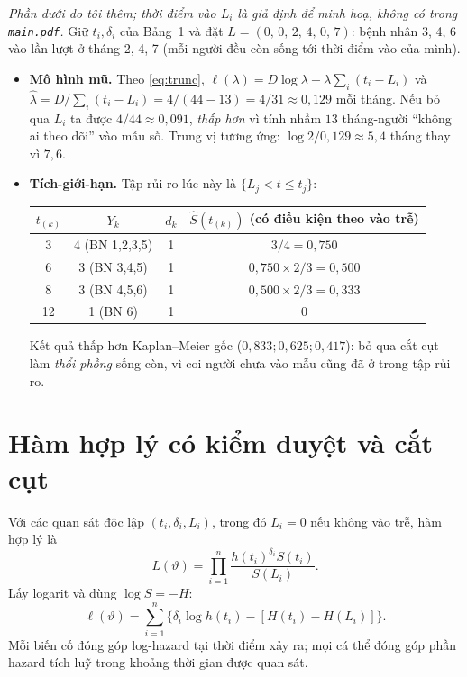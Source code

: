 \documentclass[11pt,a4paper,notitlepage]{report}
\begin{document}
\begin{vidu}
\textit{Phần dưới do tôi thêm; thời điểm vào $L_i$ là giả định để minh hoạ, không có trong \texttt{main.pdf}.} Giữ $t_i,\delta_i$ của Bảng~1 và đặt
$L=(0,\,0,\,2,\,4,\,0,\,7)$: bệnh nhân 3, 4, 6 vào lần lượt ở tháng 2, 4, 7 (mỗi người đều còn sống tới thời điểm vào của mình).
\begin{itemize}[leftmargin=1.4em,itemsep=1pt]
\item \textbf{Mô hình mũ.} Theo \eqref{eq:trunc}, $\ell(\lambda)=D\log\lambda-\lambda\sum_i(t_i-L_i)$ và $\hat\lambda=D/\sum_i(t_i-L_i)=4/(44-13)=4/31\approx0{,}129$ mỗi tháng.
Nếu bỏ qua $L_i$ ta được $4/44\approx0{,}091$, \emph{thấp hơn} vì tính nhầm $13$ tháng-người ``không ai theo dõi'' vào mẫu số. Trung vị tương ứng: $\log2/0{,}129\approx5{,}4$ tháng thay vì $7{,}6$.
\item \textbf{Tích-giới-hạn.} Tập rủi ro lúc này là $\{L_j<t\le t_j\}$:
\begin{center}\small
\begin{tabular}{cccc}
\toprule
$t_{(k)}$ & $Y_k$ & $d_k$ & $\hat S(t_{(k)})$ (có điều kiện theo vào trễ)\\
\midrule
3 & 4 (BN 1,2,3,5) & 1 & $3/4=0{,}750$\\
6 & 3 (BN 3,4,5) & 1 & $0{,}750\times 2/3=0{,}500$\\
8 & 3 (BN 4,5,6) & 1 & $0{,}500\times 2/3=0{,}333$\\
12 & 1 (BN 6) & 1 & $0$\\
\bottomrule
\end{tabular}
\end{center}
Kết quả thấp hơn Kaplan--Meier gốc ($0{,}833;0{,}625;0{,}417$): bỏ qua cắt cụt làm \emph{thổi phồng} sống còn, vì coi người chưa vào mẫu cũng đã ở trong tập rủi ro.
\end{itemize}
\end{vidu}

\section{Hàm hợp lý có kiểm duyệt và cắt cụt}

Với các quan sát độc lập $(t_i,\delta_i,L_i)$, trong đó $L_i=0$ nếu không vào trễ, hàm hợp lý là
\begin{equation}\label{eq:lik}
L(\vartheta)=\prod_{i=1}^n\frac{h(t_i)^{\delta_i}S(t_i)}{S(L_i)}.
\end{equation}
Lấy logarit và dùng $\log S=-H$:
\begin{equation}\label{eq:loglik}
\ell(\vartheta)=\sum_{i=1}^n\{\delta_i\log h(t_i)-[H(t_i)-H(L_i)]\}.
\end{equation}
Mỗi biến cố đóng góp log-hazard tại thời điểm xảy ra; mọi cá thể đóng góp phần hazard tích luỹ
trong khoảng thời gian được quan sát.
\end{document}
